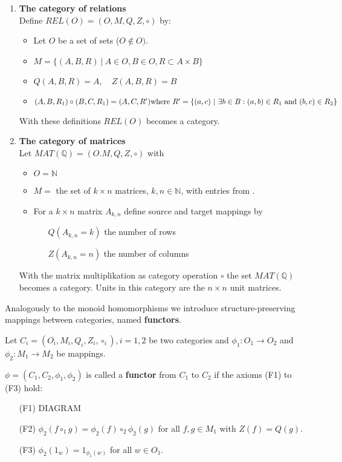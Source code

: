 \begin{enumerate}
  \item {\bf The category of relations} \\
  Define $REL(O) = (O, M, Q, Z,\circ)$ by:
  \begin{itemize}
    \item Let $O$ be a set of sets ($O \notin O)$. 
  	\item $ M = \{ (A,B,R)\ |\ A \in O, B \in O, R \subset A \times B \}$
  	\item $Q(A,B,R) = A, \quad Z(A,B,R) = B$
  	\item $(A,B,R_1) \circ (B,C,R_1) = (A,C,R')\\
  		\mbox{where}\ R'= \{ (a,c)\ |\ \exists b \in B : (a,b) \in R_1\ \mbox{and}\
  		(b,c) \in R_2 \} $
  \end{itemize}
  With these definitions $REL(O)$ becomes a category.
  
  \item {\bf The category of matrices} \\
  Let $MAT(\mathbb{Q}) = (O. M, Q, Z, \circ)$ with 
  \begin{itemize}
    \item $O = \mathbb{N}$
    \item $M = $ the set of $k \times n$ matrices, $k, n \in \mathbb{N}$, with
    entries from $\mathbb{}$.
    \item For a $k \times n$ matrix $A_{k,n}$ define source and target mappings
    by
    \begin{itemize}
	    \item[] $Q(A_{k,n} = k)$ the number of rows
  	  \item[] $Z(A_{k,n} = n)$ the number of columns
    \end{itemize}
  \end{itemize}
	With the matrix multiplikation as category operation $\circ$ the set
	$MAT(\mathbb{Q})$ becomes a category. Units in this category are the $n
  \times n$ unit matrices.
\end{enumerate}

Analogously to the monoid homomorphisms we introduce structure-preserving
mappings between categories, named {\bf functors}.

\begin{definition}
Let $C_i = (O_i, M_i, Q_i, Z_i, \circ_i), i = 1, 2$ be two categories and
$\phi_1: O_1 \to O_2$ and $\phi_2: M_1 \to M_2$ be mappings.

$\phi = (C_1, C_2, \phi_1, \phi_2)$ is called a {\bf functor} from $C_1$ to
$C_2$ if the axioms (F1) to (F3) hold:
\begin{itemize}
  \item[(F1)] DIAGRAM 
  \item[(F2)] $\phi_2(f \circ_1 g) = \phi_2(f) \circ_2 \phi_2(g)$ for all $f, g
  \in M_1$ with $Z(f) = Q(g)$.
  \item[(F3)] $\phi_2(1_w) = 1_{\phi_1(w)}$ for all $w \in O_1$.
\end{itemize}
\end{definition}

